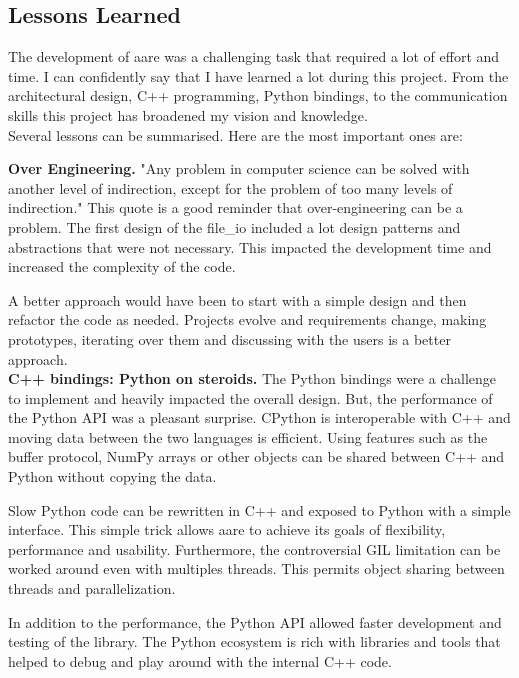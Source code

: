 \begin{spacing}{1.2}
\section*{Lessons Learned}
The development of aare was a challenging task that required a lot of effort and time.
I can confidently say that I have learned a lot during this project. From the architectural 
design, C++ programming, Python bindings, to the communication skills this project has
broadened my vision and knowledge.\\

Several lessons can be summarised. Here are the most important ones are:

\textbf{Over Engineering.} "Any problem in computer science can be solved with another
level of indirection, except for the problem of too many levels of indirection." This quote is a good
reminder that over-engineering can be a problem. The first design of the file\_io 
included a lot design patterns and abstractions that were not necessary. This impacted 
the development time and increased the complexity of the code.

A better approach would have been to start with a simple design and then refactor the
code as needed. Projects evolve and requirements change, making prototypes, iterating 
over them and discussing with the users is a better approach.\\

\textbf{C++ bindings: Python on steroids.} The Python bindings were a challenge to implement and heavily 
impacted the overall design. But, the performance of the Python API was a pleasant surprise.
 CPython is interoperable with C++
and moving data between the two languages is efficient. Using features such as the buffer
protocol, NumPy arrays or other objects can be shared between C++ and Python without 
copying the data. 

Slow Python code can be rewritten in C++ and exposed to Python with a simple interface.
This simple trick allows aare to achieve its goals of flexibility, performance and usability.
Furthermore, the controversial GIL limitation can be worked around even with multiples threads.
This permits object sharing between threads and parallelization.

In addition to the performance, the Python API allowed faster development and testing of the
library. The Python ecosystem is rich with libraries and tools that helped to debug and play around with
the internal C++ code.\\


\end{spacing}
